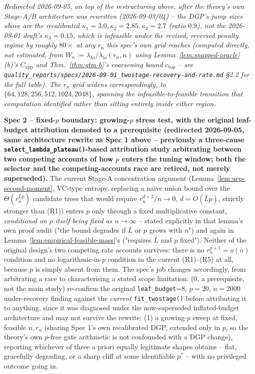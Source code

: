 \documentclass[11pt]{article}
\theoremstyle{plain}
\theoremstyle{definition}
\theoremstyle{remark}
\begin{document}
\emph{Redirected 2026-09-05, on top of the restructuring above, after
the theory's own Stage-A/B architecture was rewritten (2026-09-03/04) --
the DGP's jump sizes above are the recalibrated
$\kappa_1{=}3.0,\kappa_2{=}2.85,\kappa_3{=}2.7$ (ratio $0.9$), not the
2026-09-01 draft's $\kappa_3{=}0.15$, which is infeasible under the
revised, reversed penalty regime by roughly $80\times$ at any $r_n$ this
spec's own grid reaches (computed directly, not estimated, from
$W_n:=\lambda_{hi}/\lambda_{lo}(r_n,n)$ using
Lemma~\ref{lem:snapped-oracle}(b)'s $C_{\mathrm{app}}$ and
Thm.~\ref{thm:gtm-b}'s coarsening bound $c_{\mathrm{top}}$ -- see
\texttt{quality\_reports/specs/2026-09-01\_twostage-recovery-and-rate.md}
\S2.2 for the full table). The $r_n$ grid widens correspondingly, to
$\{64,128,256,512,1024,2048\}$, spanning the infeasible-to-feasible
transition that computation identified rather than sitting entirely
inside either region.}

\textbf{Spec 2 -- fixed-$p$ boundary: growing-$p$ stress test, with the
original leaf-budget attribution demoted to a prerequisite (redirected
2026-09-05, same architecture rewrite as Spec 1 above -- previously a
three-cause \texttt{select\_lambda\_plateau()}-based attribution study
arbitrating between two competing accounts of how $p$ enters the tuning
window; both the selector and the competing-accounts race are retired,
not merely superseded).} The current Stage-A concentration argument
(Lemma~\ref{lem:uep-second-moment}, VC-type entropy, replacing a naive
union bound over the $\Theta(r_n^{\bar Lp})$ candidate trees that would
require $r_n^{d+2}/n\to0$, $d=O(\bar Lp)$, strictly stronger than (R1))
enters $p$ only through a fixed multiplicative constant, \emph{conditional
on $p$ itself being fixed as $n\to\infty$} -- stated explicitly in that
lemma's own proof audit ("the bound degrades if $\bar L$ or $p$ grows with
$n$") and again in Lemma~\ref{lem:empirical-feasible-mass}'s ("requires
$\bar L$ and $p$ fixed"). Neither of the original design's two competing
rate accounts survives: there is no $r_n^{p+1}=o(n)$ condition and no
logarithmic-in-$p$ condition in the current (R1)--(R5) at all, because $p$
is simply absent from them. The spec's job changes accordingly, from
arbitrating a race to characterising a stated scope limitation: (0, a
prerequisite, not the main study) re-confirm the original
\texttt{leaf\_budget}=8, $p=20$, $n=2000$ under-recovery finding against
the \emph{current} \texttt{fit\_twostage()} before attributing it to
anything, since it was diagnosed under the now-superseded inflated-budget
architecture and may not survive the rewrite; (1) a growing-$p$ sweep at
fixed, feasible $n,r_n$ (sharing Spec 1's own recalibrated DGP, extended
only in $p$, so the theory's own $p$-free gate arithmetic is not
confounded with a DGP change), reporting whichever of three a priori
equally legitimate shapes obtains -- flat, gracefully degrading, or a
sharp cliff at some identifiable $p^\ast$ -- with no privileged outcome
going in.
\end{document}
